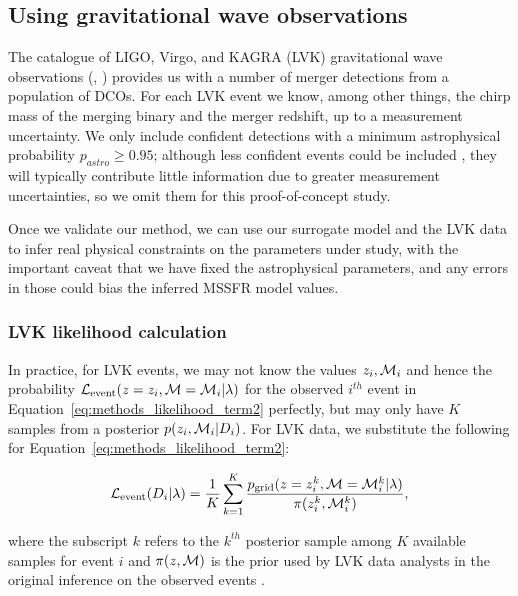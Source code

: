 \documentclass[twocolumn]{aastex631}
\begin{document}
\subsection{Using gravitational wave observations}\label{sec:method_LVK}

The catalogue of LIGO, Virgo, and KAGRA (LVK) gravitational wave observations (\citet{GWTC-2_1_zenodo}, \citet{GWTC-3_zenodo}) provides us with a number of merger detections from a population of \acp{DCO}.  For each LVK event we know, among other things, the chirp mass of the merging binary and the merger redshift, up to a measurement uncertainty. We only include confident detections with a minimum astrophysical probability $p_{astro} \ge 0.95$; although less confident events could be included \citep[e.g.][]{Farr_2015}, they will typically contribute little information due to greater measurement uncertainties, so we omit them for this proof-of-concept study.

Once we validate our method, we can use our surrogate model and the LVK data to infer real physical constraints on the parameters under study, with the important caveat that we have fixed the astrophysical parameters, and any errors in those could bias the inferred \ac{MSSFR} model values.


\subsubsection{LVK likelihood calculation}\label{sec:method_LVK_likelihood_calculation}

 In practice, for LVK events, we may not know the values $z_i, \mathcal{M}_{i}$ and hence the probability $\mathcal{L}_{\rm event}(z=z_i,\mathcal{M}=\mathcal{M}_{i}|\lambda)$ for the observed $i^{th}$ event in Equation~\ref{eq:methods_likelihood_term2} perfectly, but may only have $K$ samples from a posterior $p(z_i,\mathcal{M}_{i}|D_i)$.  For LVK data, we substitute the following for Equation~\ref{eq:methods_likelihood_term2}:

\begin{equation}
  \Le(D_i|\lambda) = \frac{1}{K} \sum_{k=1}^K \frac{\pg(z=z_i^k, \Mc=\Mc_{i}^k|\lambda)}{\pi(z_i^k,\Mc_i^k)},
  \label{eq:methods_likelihood_term2_LIGO}
\end{equation}

\bigskip\noindent
where the subscript $k$ refers to the $k^{th}$ posterior sample among $K$ available samples for event $i$ and $\pi(z,\mathcal{M})$ is the prior used by LVK data analysts in the original inference on the observed events \citep[see, e.g.][]{Mandel_2019}.
\end{document}
